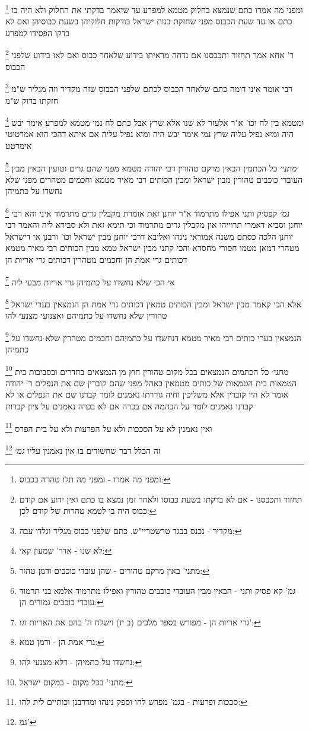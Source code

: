 \documentclass[12pt, openany]{book}
\newcommand{\footnotecomment}[1]{
	\renewcommand\thefootnote{}
	\footnote{#1}}
\newcommand{\commenta}[1]{\footnotecomment{#1}}
\begin{document}
{{\commenta{ומפני מה אמרו - ומפני מה תלו טהרה בכבוס:}
ומפני מה אמרו כתם שנמצא בחלוק מטמא למפרע עד שיאמר בדקתי את החלוק ולא היה בו כתם או עד שעת הכבוס מפני שחזקת בנות ישראל בודקות חלוקיהן בשעת כבוסיהן ואם לא בדקו הפסידו למפרע 
\commenta{תחזור ותכבסנו - אם לא בדקתו בשעת כבוסו ולאחר זמן נמצא בו כתם ואין ידוע אם קודם כבוס היה בו לטמא טהרות של קודם לכן:}
ר' אחא אמר תחזור ותכבסנו אם נדחה מראיתו בידוע שלאחר כבוס ואם לאו בידוע שלפני הכבוס 
\commenta{מקדיר - נכנס בבגד טרשטריי"ש. כתם שלפני כבוס מגליד וגלדו עבה:}
רבי אומר אינו דומה כתם שלאחר הכבוס לכתם שלפני הכבוס שזה מקדיר וזה מגליד ש"מ חזקתו בדוק ש"מ
\commenta{לא שנו - אדר' שמעון קאי:}
ומטמא בין לח וכו' א"ר אלעזר לא שנו אלא שרץ אבל כתם לח נמי מטמא למפרע אימר יבש היה ומיא נפיל עליה 
שרץ נמי אימר יבש היה ומיא נפיל עליה אם איתא דהכי הוא אמרטוטי אימרטט
\commenta{מתני' באין מרקם טהורים - שהן עובדי כוכבים ודמן טהור:}
{\large\emph{מתני׳}} כל הכתמין הבאין מרקם טהורין רבי יהודה מטמא מפני שהם גרים וטועין הבאין מבין העובדי כוכבים טהורין מבין ישראל ומבין הכותים רבי מאיר מטמא וחכמים מטהרים מפני שלא נחשדו על כתמיהן
\commenta{גמ' קא פסיק ותני - הבאין מבין העובדי כוכבים טהורין ואפילו מתרמוד אלמא בני תרמוד עובדי כוכבים גמורים הן:}
{\large\emph{גמ׳}} קפסיק ותני אפילו מתרמוד א"ר יוחנן זאת אומרת מקבלין גרים מתרמוד 
איני והא רבי יוחנן וסביא דאמרי תרוייהו אין מקבלין גרים מתרמוד 
וכי תימא זאת ולא סבירא ליה והאמר רבי יוחנן הלכה כסתם משנה 
אמוראי נינהו ואליבא דרבי יוחנן
מבין ישראל וכו' ורבנן אי דישראל מטהרי דמאן מטמו 
חסורי מחסרא והכי קתני מבין ישראל טמא מבין הכותים רבי מאיר מטמא דכותים גרי אמת הן וחכמים מטהרין דכותים גרי אריות הן 
\commenta{גרי אריות הן - מפורש בספר מלכים (ב יז) וישלח ה' בהם את האריות וגו':
}
אי הכי שלא נחשדו על כתמיהן גרי אריות מבעי ליה 
\commenta{גרי אמת הן - ודמן טמא:}
אלא הכי קאמר מבין ישראל ומבין הכותים טמאין דכותים גרי אמת הן הנמצאין בערי ישראל טהורין שלא נחשדו על כתמיהם ואצנועי מצנעי להו 
\commenta{נחשדו על כתמיהן - דלא מצנעי להו:
}
הנמצאין בערי כותים רבי מאיר מטמא דנחשדו על כתמיהם וחכמים מטהרין שלא נחשדו על כתמיהן 
\commenta{מתני' בכל מקום - במקום ישראל:}
{\large\emph{מתני׳}} כל הכתמים הנמצאים בכל מקום טהורין חוץ מן הנמצאים בחדרים ובסביבות בית הטמאות
בית הטמאות של כותים מטמאין באהל מפני שהם קוברין שם את הנפלים ר' יהודה אומר לא היו קוברין אלא משליכין וחיה גוררתו 
נאמנים לומר קברנו שם את הנפלים או לא קברנו נאמנים לומר על הבהמה אם בכרה אם לא בכרה נאמנים על ציון קברות
\commenta{סככות ופרעות - בגמ' מפרש להו וספק נינהו ומדרבנן וכותיים לית להו:}
ואין נאמנין לא על הסככות ולא על הפרעות ולא על בית הפרס 
\commenta{ גמ'}
זה הכלל דבר שחשודים בו אין נאמנין עליו {\large\emph{גמ׳}} 
\clearpage}

}
\end{document}
